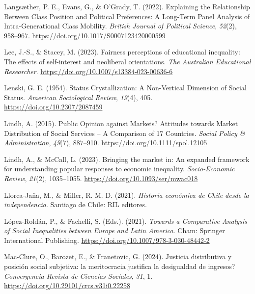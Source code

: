 \documentclass[
  13pt,
]{article}
\newlength{\cslhangindent}
\newenvironment{CSLReferences}[2] %
 {\begin{list}{}{%
  \setlength{\itemindent}{0pt}
  \setlength{\leftmargin}{0pt}
  \setlength{\parsep}{0pt}
  \ifodd #1
   \setlength{\leftmargin}{\cslhangindent}
   \setlength{\itemindent}{-1\cslhangindent}
  \fi
  \setlength{\itemsep}{#2\baselineskip}}}
 {\end{list}}
\begin{document}
\begin{CSLReferences}{1}{0}
Langsæther, P. E., Evans, G., \& O'Grady, T. (2022). Explaining the
{Relationship Between Class Position} and {Political Preferences}: {A
Long-Term Panel Analysis} of {Intra-Generational Class Mobility}.
\emph{British Journal of Political Science}, \emph{52}(2), 958--967.
\url{https://doi.org/10.1017/S0007123420000599}

Lee, J.-S., \& Stacey, M. (2023). Fairness perceptions of educational
inequality: The effects of self-interest and neoliberal orientations.
\emph{The Australian Educational Researcher}.
\url{https://doi.org/10.1007/s13384-023-00636-6}

Lenski, G. E. (1954). Status {Crystallization}: {A Non-Vertical
Dimension} of {Social Status}. \emph{American Sociological Review},
\emph{19}(4), 405. \url{https://doi.org/10.2307/2087459}

Lindh, A. (2015). Public {Opinion} against {Markets}? {Attitudes}
towards {Market Distribution} of {Social Services} -- {A Comparison} of
17 {Countries}. \emph{Social Policy \& Administration}, \emph{49}(7),
887--910. \url{https://doi.org/10.1111/spol.12105}

Lindh, A., \& McCall, L. (2023). Bringing the market in: An expanded
framework for understanding popular responses to economic inequality.
\emph{Socio-Economic Review}, \emph{21}(2), 1035--1055.
\url{https://doi.org/10.1093/ser/mwac018}

Llorca-Jaña, M., \& Miller, R. M. D. (2021). \emph{{Historia econ{ó}mica
de Chile desde la independencia}}. Santiago de Chile: RIL editores.

López-Roldán, P., \& Fachelli, S. (Eds.). (2021). \emph{Towards a
{Comparative Analysis} of {Social Inequalities} between {Europe} and
{Latin America}}. Cham: Springer International Publishing.
\url{https://doi.org/10.1007/978-3-030-48442-2}

Mac-Clure, O., Barozet, E., \& Franetovic, G. (2024). {Justicia
distributiva y posici{ó}n social subjetiva: {\textquestiondown}la
meritocracia justifica la desigualdad de ingresos?} \emph{Convergencia
Revista de Ciencias Sociales}, \emph{31}, 1.
\url{https://doi.org/10.29101/crcs.v31i0.22258}


\end{CSLReferences}
\end{document}
